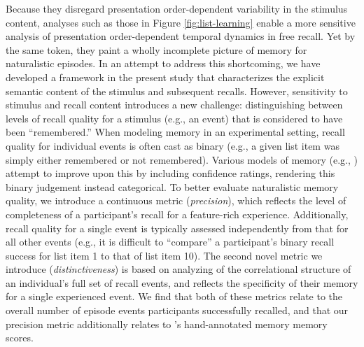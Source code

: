 Because they disregard presentation order-dependent variability in the stimulus content, analyses such as those in Figure \ref{fig:list-learning} enable a more sensitive analysis of presentation order-dependent temporal dynamics in free recall. Yet by the same token, they paint a wholly incomplete picture of memory for naturalistic episodes.  In an attempt to address this shortcoming, we have developed a framework in the present study that characterizes the explicit semantic content of the stimulus and subsequent recalls.  However, sensitivity to stimulus and recall content introduces a new challenge: distinguishing between levels of recall quality for a stimulus (e.g., an event) that is considered to have been ``remembered.''  When modeling memory in an experimental setting, recall quality for individual events is often cast as binary (e.g., a given list item was simply either remembered or not remembered).  Various models of memory (e.g., \citealp{Yone02}) attempt to improve upon this by including confidence ratings, rendering this binary judgement instead categorical.  To better evaluate naturalistic memory quality, we introduce a continuous metric (\textit{precision}), which reflects the level of completeness of a participant's recall for a feature-rich experience.  Additionally, recall quality for a single event is typically assessed independently from that for all other events (e.g., it is difficult to ``compare'' a participant's binary recall success for list item 1 to that of list item 10).  The second novel metric we introduce (\textit{distinctiveness}) is based on analyzing of the correlational structure of an individual's full set of recall events, and reflects the specificity of their memory for a single experienced event.  We find that both of these metrics relate to the overall number of episode events participants successfully recalled, and that our precision metric additionally relates to \cite{ChenEtal17}'s hand-annotated memory memory scores.

